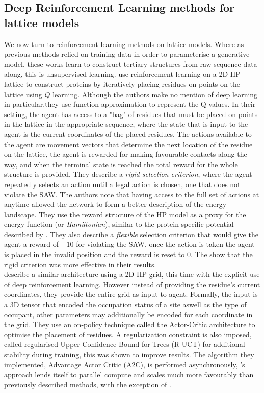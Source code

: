 \subsection{Deep Reinforcement Learning methods for lattice models}
We now turn to reinforcement learning methods on lattice models. Where as previous methods relied on
training data in order to parameterise a generative model, these works learn to construct tertiary structures
from raw sequence data along, this is unsupervised learning.
\cite{Wu2019} use reinforcement learning on a 2D HP lattice to construct proteins by iteratively
placing residues on points on the lattice using $Q$ learning. Although the authors make no mention of
deep learning in particular,they use function approximation to represent the Q values. In their setting,
the agent has access to a "bag" of residues that must be placed on points in the lattice in the appropriate
sequence, where the state that is input to the agent is the current coordinates of the placed residues. 
The actions available to the agent are movement vectors that determine the next location of the residue on the 
lattice, the agent is rewarded for making favourable contacts along the way, and when the terminal state is reached
the total reward for the whole structure is provided. They describe a \emph{rigid selection criterion}, where the agent
repeatedly selects an action until a legal action is chosen, one that does not violate the SAW. The authors note that having access
to the full set of actions at anytime allowed the network to form a better description of the energy landscape. They 
use the reward structure of the HP model as a proxy for the energy function (or \emph{Hamiltonian}), similar to the 
protein specific potential described by \cite{Senior2020}. They also describe a \emph{flexible} selection criterion
that would give the agent a reward of $-10$ for violating the SAW, once the action is taken the agent is placed in the invalid
position and the reward is reset to 0. The show that the rigid criterion was more effective in their results.\\

\cite{Yanjun2018} describe a similar architecture using a 2D HP grid, this time with the explicit use of deep reinforcement learning.
However instead of providing the residue's current coordinates, they provide the entire grid as input to agent. Formally,
the input is a 3D tensor that encoded the occupation status of a site aswell as the type of occupant, other parameters may additionally be encoded
for each coordinate in the grid. They use an on-policy technique called the Actor-Critic architecture \cite{Mnih2016} to optimise the placement
of residues. A regularization constraint is also imposed, called regularised Upper-Confidence-Bound for Trees (R-UCT) for 
additional stability during training, this was shown to improve results. The algorithm they implemented, Advantage Actor Critic (A2C),
is performed asynchronously, \cite{Yanjun2018}'s approach lends itself to parallel compute and scales much more favourably than
previously described methods, with the exception of \cite{Senior2020,Yang2020}.

